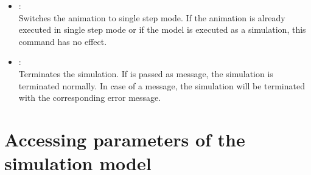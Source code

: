 \begin{itemize}
\item
{}:\\
Switches the animation to single step mode. If the animation is already executed in
single step mode or if the model is executed as a simulation, this command has no effect.

\item
{}:\\
Terminates the simulation. If  is passed as message, the simulation is terminated normally.
In case of a message, the simulation will be terminated with the corresponding error message.
	
\end{itemize}

\section{Accessing parameters of the simulation model}

